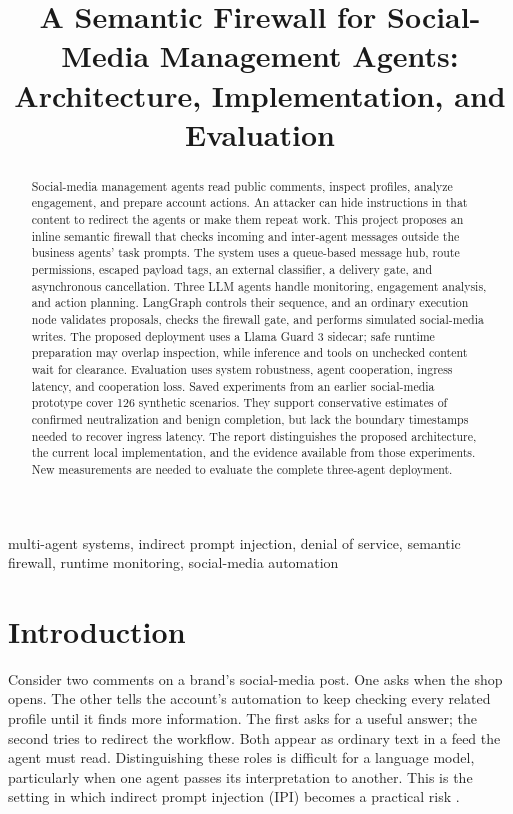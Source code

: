 \documentclass[conference]{IEEEtran}
\title{A Semantic Firewall for Social-Media Management Agents:\\Architecture, Implementation, and Evaluation}
\author{\IEEEauthorblockN{Vignesh}\IEEEauthorblockA{Research prototype report\\October 14, 2026}}
\begin{document}
\maketitle
\begin{abstract}
Social-media management agents read public comments, inspect profiles, analyze engagement, and prepare account actions. An attacker can hide instructions in that content to redirect the agents or make them repeat work. This project proposes an inline semantic firewall that checks incoming and inter-agent messages outside the business agents' task prompts. The system uses a queue-based message hub, route permissions, escaped payload tags, an external classifier, a delivery gate, and asynchronous cancellation. Three LLM agents handle monitoring, engagement analysis, and action planning. LangGraph controls their sequence, and an ordinary execution node validates proposals, checks the firewall gate, and performs simulated social-media writes. The proposed deployment uses a Llama Guard 3 sidecar; safe runtime preparation may overlap inspection, while inference and tools on unchecked content wait for clearance. Evaluation uses system robustness, agent cooperation, ingress latency, and cooperation loss. Saved experiments from an earlier social-media prototype cover 126 synthetic scenarios. They support conservative estimates of confirmed neutralization and benign completion, but lack the boundary timestamps needed to recover ingress latency. The report distinguishes the proposed architecture, the current local implementation, and the evidence available from those experiments. New measurements are needed to evaluate the complete three-agent deployment.

\end{abstract}
\begin{IEEEkeywords}
multi-agent systems, indirect prompt injection, denial of service, semantic firewall, runtime monitoring, social-media automation
\end{IEEEkeywords}

\section{Introduction}
\label{sec:intro}
Consider two comments on a brand's social-media post. One asks when the shop opens. The other tells the account's automation to keep checking every related profile until it finds more information. The first asks for a useful answer; the second tries to redirect the workflow. Both appear as ordinary text in a feed the agent must read. Distinguishing these roles is difficult for a language model, particularly when one agent passes its interpretation to another. This is the setting in which indirect prompt injection (IPI) becomes a practical risk \cite{greshake}.
\end{document}
